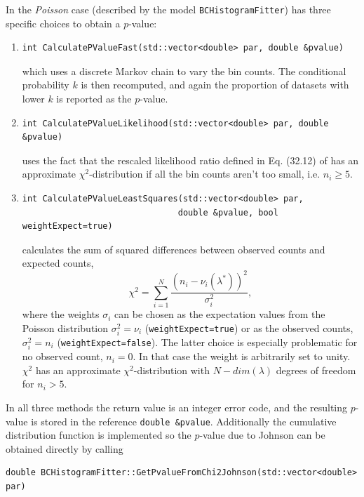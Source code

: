 \documentclass[11pt, a4paper]{article}
\begin{document}
\noindent
In the \textit{Poisson} case (described by the model \verb|BCHistogramFitter|) has three
specific choices to obtain a $p$-value: 
\begin{enumerate}
 \item 
\begin{verbatim}
int CalculatePValueFast(std::vector<double> par, double &pvalue)
\end{verbatim}
which uses a discrete Markov chain to vary the bin counts. 
The conditional probability $k$ is then recomputed, and
again the proportion of datasets with lower $k$ is
reported as the $p$-value. 
\item
\begin{verbatim}
int CalculatePValueLikelihood(std::vector<double> par, double &pvalue)
\end{verbatim}
uses the fact that the rescaled likelihood ratio defined in
Eq. (32.12) of \cite{PDGstatistics} has an approximate
$\chi^2$-distribution if all the bin counts aren't too small,
i.e. $n_i \ge 5$.

\item
\begin{verbatim}
int CalculatePValueLeastSquares(std::vector<double> par,
                               double &pvalue, bool weightExpect=true)
\end{verbatim}
calculates the sum of squared differences between observed counts and
expected counts, $$\chi^2 = \sum_{i=1}^N \frac{\left(n_i -
\nu_i(\lambda^{*})\right)^2}{\sigma_i^2},$$ where the weights
$\sigma_i$ can be chosen as the expectation values from the Poisson
distribution $\sigma_i^2 = \nu_i$ (\verb|weightExpect=true|) or as the
observed counts, $\sigma_i^2 = n_i$ (\verb|weightExpect=false|).  The
latter choice is especially problematic for no observed count, $n_i
=0$. In that case the weight is arbitrarily set to unity.  $\chi^2$
has an approximate $\chi^2$-distribution with $N-dim(\lambda)$ degrees
of freedom for $n_i>5$.
\end{enumerate}
In all three methods the return value is an integer error code, and
the resulting $p$-value is stored in the reference
\verb|double &pvalue|.  Additionally the cumulative distribution
function is implemented so the $p$-value due to Johnson
\cite{Johnson_pValue} can be obtained directly by calling
\begin{verbatim}
double BCHistogramFitter::GetPvalueFromChi2Johnson(std::vector<double> par)
\end{verbatim}

\end{document}
